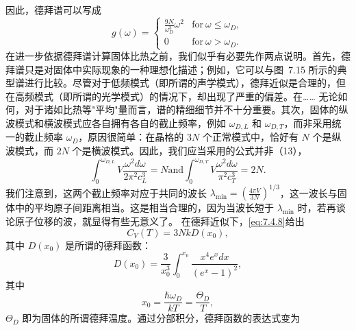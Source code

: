 因此，德拜谱可以写成
\begin{equation}\tag{7.4.14}\label{eq:7.4.14}
g ( \omega ) = \left\{ \begin{array}{ll} { \displaystyle \frac { 9 N } { \omega _ { D } ^{3} } \omega ^{2} } & { \mathrm { f o r ~ } \omega \leq \omega _ { D } , } \\{ 0 } & { \mathrm { f o r ~ } \omega > \omega _ { D } . } \end{array} \right.
\end{equation}
在进一步依据德拜谱计算固体比热之前，我们似乎有必要先作两点说明。首先，德拜谱只是对固体中实际现象的一种理想化描述；例如，它可以与图~7.15 所示的典型谱进行比较。尽管对于低频模式（即所谓的声学模式），德拜近似是合理的，但在高频模式（即所谓的光学模式）的情况下，却出现了严重的偏差。在\ldots\ldots{}
无论如何，对于诸如比热等"平均"量而言，谱的精细细节并不十分重要。其次，固体的纵波模式和横波模式应各自拥有各自的截止频率，例如 \(\omega_{D,L}\) 和 \(\omega_{D,T}\)，而非采用统一的截止频率 \(\omega_{D}\)，原因很简单：在晶格的 \(3N\) 个正常模式中，恰好有 \(N\) 个是纵波模式，而 \(2N\) 个是横波模式。因此，我们应当采用的公式并非（13），
\begin{equation}\tag{7.4.15}\label{eq:7.4.15}
\int _ { 0 } ^{\omega _ { D , L} } V \frac { \omega ^{2} d \omega } { 2 \pi ^{2} c _ { L } ^{3} } = N  \mathrm { a n d }  \int _ { 0 } ^{\omega _ { D , T} } V \frac { \omega ^{2} d \omega } { \pi ^{2} c _ { T } ^{3} } = 2 N .
\end{equation}
我们注意到，这两个截止频率对应于共同的波长 \(\lambda_{\mathrm{min}} = \left( \frac{4\pi V}{3N} \right)^{1/3}\)，这一波长与固体中的平均原子间距离相当。这是相当合理的，因为当波长短于 \(\lambda_{\mathrm{min}}\) 时，若再谈论原子位移的波，就显得有些无意义了。
在德拜近似下，\autoref{eq:7.4.8}给出
\begin{equation}\tag{7.4.16}\label{eq:7.4.16}
C _ { V } ( T ) = 3 N k D ( x _ { 0 } ) ,
\end{equation}
其中 \(D(x_0)\) 是所谓的德拜函数：
\begin{equation}\tag{7.4.17}\label{eq:7.4.17}
D ( x _ { 0 } ) = \frac { 3 } { x _ { 0 } ^{3} } \int _ { 0 } ^{x _ { 0} } \frac { x ^{4} e ^{x} d x } { ( e ^{x} - 1 ) ^{2} } ,
\end{equation}
其中
\begin{equation}\tag{7.4.18}\label{eq:7.4.18}
x _ { 0 } = \frac { \hbar \omega _ { D } } { k T } = \frac { \Theta _ { D } } { T } ,
\end{equation}
\(\Theta_{D}\) 即为固体的所谓德拜温度。通过分部积分，德拜函数的表达式变为
